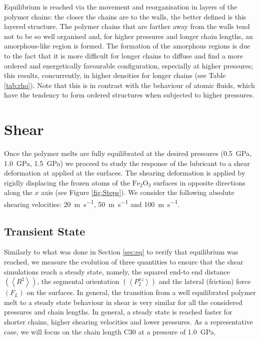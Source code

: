 \documentclass[aps,prb,reprint,superscriptaddress, a4paper]{revtex4-1}
\begin{document}
Equilibrium is reached via the movement and reorganisation in layers  of the polymer chains: the closer the chains are to the walls, the better defined is this layered structure. The polymer chains that are farther away  from the walls tend not to be so well organised and, for higher pressures and longer chain lengths, an amorphous-like region is formed. The formation of the amorphous regions is due to the fact that it is more difficult for longer chains to diffuse and find a more ordered and energetically favourable configuration, especially at higher pressures; this results, concurrently,  in  higher densities for longer chains (see Table \ref{tab:rho}). Note that this is in contrast with the behaviour of atomic fluids, which have the tendency to form ordered structures when subjected to higher pressures. 



\section{Shear}

Once the polymer melts are fully equilibrated at the desired pressures (\SI{0.5}{\giga\pascal}, \SI{1.0}{\giga\pascal}, \SI{1.5}{\giga\pascal}) we proceed to study the response of the lubricant to a shear deformation at applied  at the surfaces. The shearing deformation is applied by rigidly displacing the frozen atoms of the $\text{Fe}_2\text{O}_3$ surfaces in opposite directions along the $x$ axis (see Figure \ref{fig:Steps}). We consider the following absolute shearing velocities: \SI{20}{\meter\per\second}, \SI{50}{\meter\per\second} and \SI{100}{\meter\per\second}.



\subsection{Transient State}

Similarly to what was done in Section \ref{sec:eq} to verify that equilibrium was reached, we measure the evolution of three quantities to ensure that the shear simulations reach a steady state, namely,  the squared end-to end distance $\left(\left< R^2 \right> \right)$, the segmental orientation $\left(\left<P_{2}^{xz} \right> \right)$ and the lateral (friction) force $\left(F_L \right)$ on the surfaces. In general, the transition from a well equilibrated polymer melt to a steady state behaviour in shear is very similar for all the considered pressures and chain lengths. In general, a steady state is reached faster for shorter chains, higher shearing velocities and lower pressures. As a representative case, we will focus on the chain length C30 at a pressure of  \SI{1.0}{\giga\pascal}.
 
\end{document}
